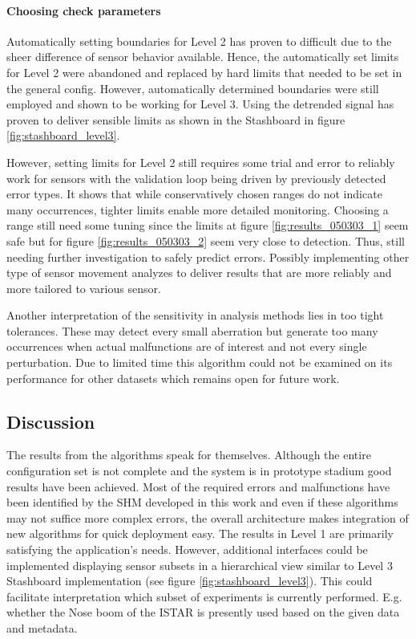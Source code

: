 \paragraph{Choosing check parameters}

Automatically setting boundaries for Level 2 has proven to difficult due to the sheer difference of sensor behavior available. Hence, the automatically set limits for Level 2 were abandoned and replaced by hard limits that needed to be set in the general config. However, automatically determined boundaries were still employed and shown to be working for Level 3. Using the detrended signal has proven to deliver sensible limits as shown in the Stashboard in figure \ref{fig:stashboard_level3}.

However, setting limits for Level 2 still requires some trial and error to reliably work for sensors with the validation loop being driven by previously detected error types. It shows that while conservatively chosen ranges do not indicate many occurrences, tighter limits enable more detailed monitoring. Choosing a range still need some tuning since the limits at figure \ref{fig:results_050303_1} seem safe but for figure \ref{fig:results_050303_2} seem very close to detection. Thus, still needing further investigation to safely predict errors. Possibly implementing other type of sensor movement analyzes to deliver results that are more reliably and more tailored to various sensor.

Another interpretation of the sensitivity in analysis methods lies in too tight tolerances. These may detect every small aberration but generate too many occurrences when actual malfunctions are of interest and not every single perturbation. Due to limited time this algorithm could not be examined on its performance for other datasets which remains open for future work.


\subsection{Discussion}
The results from the algorithms speak for themselves. Although the entire configuration set is not complete and the system is in prototype stadium good results have been achieved. Most of the required errors and malfunctions have been identified by the SHM developed in this work and even if these algorithms may not suffice more complex errors, the overall architecture makes integration of new algorithms for quick deployment easy.
The results in Level 1 are primarily satisfying the application's needs. However, additional interfaces could be implemented displaying sensor subsets in a hierarchical view similar to Level 3 Stashboard implementation (see figure \ref{fig:stashboard_level3}). This could facilitate interpretation which subset of experiments is currently performed. E.g. whether the Nose boom of the ISTAR is presently used based on the given data and metadata.

